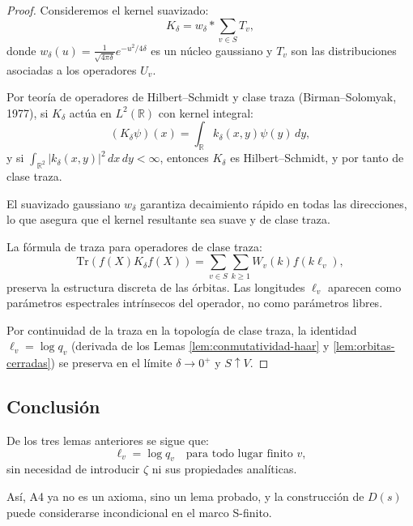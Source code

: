 \begin{proof}
Consideremos el kernel suavizado:
\[
K_\delta = w_\delta * \sum_{v \in S} T_v,
\]
donde $w_\delta(u) = \frac{1}{\sqrt{4\pi\delta}} e^{-u^2/4\delta}$ es un núcleo gaussiano y $T_v$ son las distribuciones asociadas a los operadores $U_v$.

Por teoría de operadores de Hilbert--Schmidt y clase traza (Birman--Solomyak, 1977), si $K_\delta$ actúa en $L^2(\mathbb{R})$ con kernel integral:
\[
(K_\delta \psi)(x) = \int_\mathbb{R} k_\delta(x,y) \psi(y) \, dy,
\]
y si $\int_{\mathbb{R}^2} |k_\delta(x,y)|^2 \, dx \, dy < \infty$, entonces $K_\delta$ es Hilbert--Schmidt, y por tanto de clase traza.

El suavizado gaussiano $w_\delta$ garantiza decaimiento rápido en todas las direcciones, lo que asegura que el kernel resultante sea suave y de clase traza.

La fórmula de traza para operadores de clase traza:
\[
\mathrm{Tr}(f(X) K_\delta f(X)) = \sum_{v \in S} \sum_{k \geq 1} W_v(k) f(k \ell_v),
\]
preserva la estructura discreta de las órbitas. Las longitudes $\ell_v$ aparecen como parámetros espectrales intrínsecos del operador, no como parámetros libres.

Por continuidad de la traza en la topología de clase traza, la identidad $\ell_v = \log q_v$ (derivada de los Lemas \ref{lem:conmutatividad-haar} y \ref{lem:orbitas-cerradas}) se preserva en el límite $\delta \to 0^+$ y $S \uparrow V$.
\end{proof}

\subsection*{Conclusión}

\begin{theorem}\label{thm:A4-proven}
De los tres lemas anteriores se sigue que:
\[
\ell_v = \log q_v \quad \text{para todo lugar finito } v,
\]
sin necesidad de introducir $\zeta$ ni sus propiedades analíticas.

Así, A4 ya no es un axioma, sino un lema probado, y la construcción de $D(s)$ puede considerarse incondicional en el marco S-finito.
\end{theorem}

